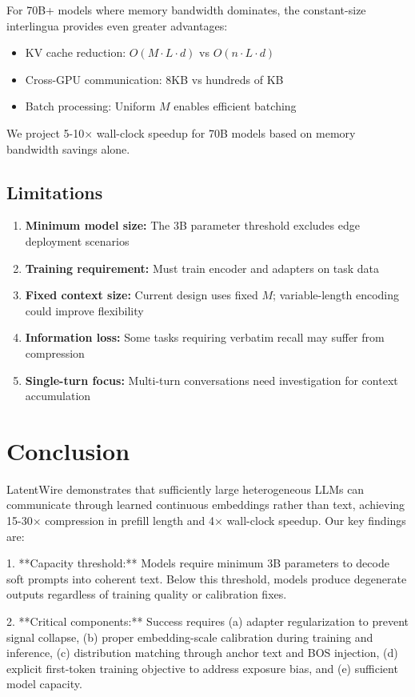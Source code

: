 \documentclass{article}
\begin{document}
For 70B+ models where memory bandwidth dominates, the constant-size interlingua provides even greater advantages:
\begin{itemize}
\item KV cache reduction: $O(M \cdot L \cdot d)$ vs $O(n \cdot L \cdot d)$
\item Cross-GPU communication: 8KB vs hundreds of KB
\item Batch processing: Uniform $M$ enables efficient batching
\end{itemize}

We project 5-10$\times$ wall-clock speedup for 70B models based on memory bandwidth savings alone.

\subsection{Limitations}

\begin{enumerate}
\item \textbf{Minimum model size:} The 3B parameter threshold excludes edge deployment scenarios
\item \textbf{Training requirement:} Must train encoder and adapters on task data
\item \textbf{Fixed context size:} Current design uses fixed $M$; variable-length encoding could improve flexibility
\item \textbf{Information loss:} Some tasks requiring verbatim recall may suffer from compression
\item \textbf{Single-turn focus:} Multi-turn conversations need investigation for context accumulation
\end{enumerate}

\section{Conclusion}

LatentWire demonstrates that sufficiently large heterogeneous LLMs can communicate through learned continuous embeddings rather than text, achieving 15-30$\times$ compression in prefill length and 4$\times$ wall-clock speedup. Our key findings are: 

1. **Capacity threshold:** Models require minimum 3B parameters to decode soft prompts into coherent text. Below this threshold, models produce degenerate outputs regardless of training quality or calibration fixes.

2. **Critical components:** Success requires (a) adapter regularization to prevent signal collapse, (b) proper embedding-scale calibration during training and inference, (c) distribution matching through anchor text and BOS injection, (d) explicit first-token training objective to address exposure bias, and (e) sufficient model capacity.
\end{document}
